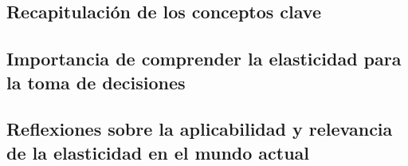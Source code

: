 \documentclass[
  a4paper,
]{article}
\begin{document}
\hypertarget{recapitulaciuxf3n-de-los-conceptos-clave}{%
\subsection{Recapitulación de los conceptos
clave}\label{recapitulaciuxf3n-de-los-conceptos-clave}}

\hypertarget{importancia-de-comprender-la-elasticidad-para-la-toma-de-decisiones}{%
\subsection{Importancia de comprender la elasticidad para la toma de
decisiones}\label{importancia-de-comprender-la-elasticidad-para-la-toma-de-decisiones}}

\hypertarget{reflexiones-sobre-la-aplicabilidad-y-relevancia-de-la-elasticidad-en-el-mundo-actual}{%
\subsection{Reflexiones sobre la aplicabilidad y relevancia de la
elasticidad en el mundo
actual}\label{reflexiones-sobre-la-aplicabilidad-y-relevancia-de-la-elasticidad-en-el-mundo-actual}}


\printbibliography
\end{document}
